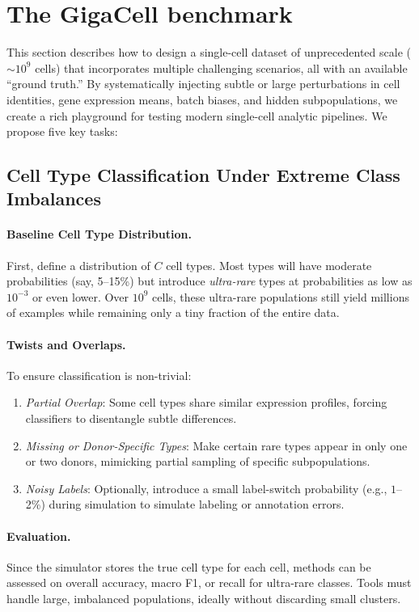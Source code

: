 \documentclass{article}
\begin{document}
\section{The GigaCell benchmark}
\label{sec:1Bbenchmark}

This section describes how to design a single-cell dataset of unprecedented scale (\(\sim 10^9\) cells) that incorporates multiple challenging scenarios, all with an available ``ground truth.'' By systematically injecting subtle or large perturbations in cell identities, gene expression means, batch biases, and hidden subpopulations, we create a rich playground for testing modern single-cell analytic pipelines. We propose five key tasks:

\subsection{Cell Type Classification Under Extreme Class Imbalances}
\label{sec:1B_celltype}

\paragraph{Baseline Cell Type Distribution.}
First, define a distribution of $C$ cell types. Most types will have moderate probabilities (say, 5--15\%) but introduce \emph{ultra-rare} types at probabilities as low as $10^{-3}$ or even lower. Over $10^9$ cells, these ultra-rare populations still yield millions of examples while remaining only a tiny fraction of the entire data.

\paragraph{Twists and Overlaps.}
To ensure classification is non-trivial:
\begin{enumerate}
	\item \emph{Partial Overlap}: Some cell types share similar expression profiles, forcing classifiers to disentangle subtle differences.
	\item \emph{Missing or Donor-Specific Types}: Make certain rare types appear in only one or two donors, mimicking partial sampling of specific subpopulations.
	\item \emph{Noisy Labels}: Optionally, introduce a small label-switch probability (e.g., $1$--2\%) during simulation to simulate labeling or annotation errors.
\end{enumerate}

\paragraph{Evaluation.}
Since the simulator stores the true cell type for each cell, methods can be assessed on overall accuracy, macro F1, or recall for ultra-rare classes. Tools must handle large, imbalanced populations, ideally without discarding small clusters.
\end{document}
